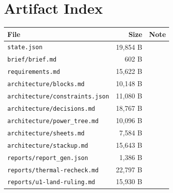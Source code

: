 \documentclass[11pt,a4paper]{article}
\begin{document}
\section{Artifact Index}
{\small
\begin{longtable}{p{9cm}rp{4cm}}
\toprule
\textbf{File} & \textbf{Size} & \textbf{Note} \\
\midrule
\endhead
\texttt{state.json} & 19,854 B &  \\
\texttt{brief/brief.md} & 602 B &  \\
\texttt{requirements.md} & 15,622 B &  \\
\texttt{architecture/blocks.md} & 10,148 B &  \\
\texttt{architecture/constraints.json} & 11,080 B &  \\
\texttt{architecture/decisions.md} & 18,767 B &  \\
\texttt{architecture/power\_tree.md} & 10,096 B &  \\
\texttt{architecture/sheets.md} & 7,584 B &  \\
\texttt{architecture/stackup.md} & 15,643 B &  \\
\texttt{reports/report\_gen.json} & 1,386 B &  \\
\texttt{reports/thermal-recheck.md} & 22,797 B &  \\
\texttt{reports/u1-land-ruling.md} & 15,930 B &  \\
\bottomrule
\end{longtable}
}
\end{document}
